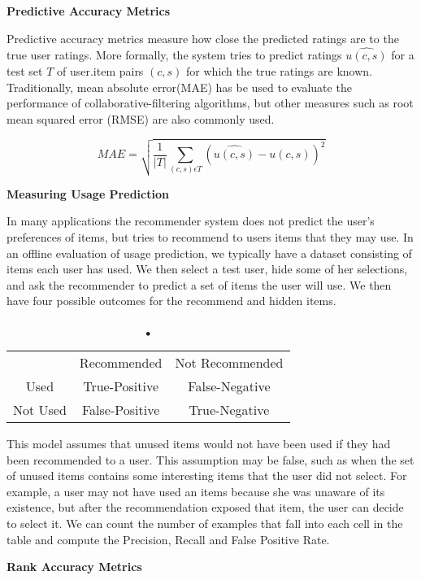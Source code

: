 \textbf{Predictive Accuracy Metrics}

Predictive accuracy metrics measure how close the predicted ratings are to the true user ratings. More formally, the system tries to predict ratings $\hat{u(c,s)}$ for a test set $T$ of user.item pairs $(c, s)$ for which the true ratings are known. Traditionally, mean absolute error(MAE) has be used to evaluate the performance of collaborative-filtering algorithms, but other measures such as root mean squared error (RMSE) are also commonly used.

\begin{equation}
MAE = \sqrt{\frac{1}{\vert T \vert} \sum_{(c,s) \epsilon T}  (\hat{u(c,s)} - u(c,s))^{2}}
\end{equation}

\textbf{Measuring Usage Prediction}

In many applications the recommender system does not predict the user's preferences of items, but tries to recommend to users items that they may use. In an offline evaluation of usage prediction, we typically have a dataset consisting of items each user has used. We then select a test user, hide some of her selections, and ask the recommender to predict a set of items the user will use. We then have four possible outcomes for the recommend and hidden items.

\begin{table}
\caption{•}
\begin{tabular}{c c c}
\hline
			&	Recommended		&	Not Recommended \\
Used		&	True-Positive 	&	False-Negative	\\
Not Used	&	False-Positive	&	True-Negative	\\
\hline
\end{tabular}
\label{table:usageprediction}
\end{table}

This model assumes that unused items would not have been used if they had been recommended to a user. This assumption may be false, such as when the set of unused items contains some interesting items that the user did not select. For example, a user may not have used an items because she was unaware of its existence, but after the recommendation exposed that item, the user can decide to select it. We can count the number of examples that fall into each cell in the table and compute the Precision, Recall and False Positive Rate.

\textbf{Rank Accuracy Metrics}

